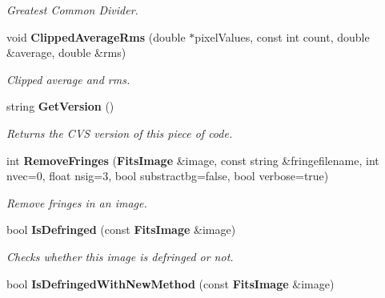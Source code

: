 \begin{CompactItemize}
\begin{CompactList}\small\item\em Greatest Common Divider.\item\end{CompactList}\item 
{}
void {\bf Clipped\-Average\-Rms} (double $\ast$pixel\-Values, const int count, double \&average, double \&rms)\label{class_fringeutils_d7}

\begin{CompactList}\small\item\em Clipped average and rms.\item\end{CompactList}\item 
{}
string {\bf Get\-Version} ()\label{class_fringeutils_d8}

\begin{CompactList}\small\item\em Returns the CVS version of this piece of code.\item\end{CompactList}\item 
int {\bf Remove\-Fringes} ({\bf Fits\-Image} \&image, const string \&fringefilename, int nvec=0, float nsig=3, bool substractbg=false, bool verbose=true)
\begin{CompactList}\small\item\em Remove fringes in an image.\item\end{CompactList}\item 
{}
bool {\bf Is\-Defringed} (const {\bf Fits\-Image} \&image)\label{class_fringeutils_d10}

\begin{CompactList}\small\item\em Checks whether this image is defringed or not.\item\end{CompactList}\item 
{}
bool {\bf Is\-Defringed\-With\-New\-Method} (const {\bf Fits\-Image} \&image)\label{class_fringeutils_d11}


\end{CompactItemize}
